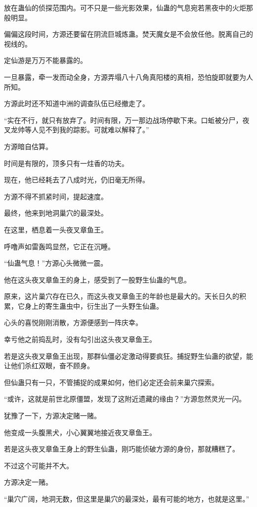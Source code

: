 \begin{this_body}
放在蛊仙的侦探范围内。可不只是一些光影效果，仙蛊的气息宛若黑夜中的火炬那般明显。

偏偏这段时间，方源还要留在阴流巨城炼蛊。焚天魔女是不会放任他。脱离自己的视线的。

定仙游是万万不能暴露的。

一旦暴露，牵一发而动全身，方源弄塌八十八角真阳楼的真相，恐怕旋即就要为人所知。

方源此时还不知道中洲的调查队伍已经撤走了。

“实在不行，就只有放弃了。时间有限，万一那边战场停歇下来。口蚯被分尸，夜叉龙帅等人见不到我的踪影。可就难以解释了。”

方源暗自估算。

时间是有限的，顶多只有一炷香的功夫。

现在，他已经耗去了八成时光，仍旧毫无所得。

方源不得不抓紧时间，提起速度。

最终，他来到地洞巢穴的最深处。

在这里，栖息着一头夜叉章鱼王。

呼噜声如雷轰鸣显然，它正在沉睡。

“仙蛊气息！”方源心头微微一震。

他在这头夜叉章鱼王的身上，感受到了一股野生仙蛊的气息。

原来，这片巢穴存在已久，而这头夜叉章鱼王的年龄也是最大的。天长日久的积累，它身上的寄生蛊虫中，衍生出了一头野生仙蛊。

心头的喜悦刚刚消散，方源便感到一阵庆幸。

幸亏他之前捣乱时，没有勾引出这头夜叉章鱼王。

若是这头夜叉章鱼王出现，那群仙僵必定激动得要疯狂。捕捉野生仙蛊的欲望，能让他们杀红双眼，奋不顾身。

但仙蛊只有一只，不管捕捉的成果如何，他们必定还会前来巢穴探索。

“或许，这就是前世北原僵盟，发现了这附近遗藏的缘由？”方源忽然灵光一闪。

犹豫了一下，方源决定赌一赌。

他变成一头腹黑犬，小心翼翼地接近夜叉章鱼王。

若是这头夜叉章鱼王身上的野生仙蛊，刚巧能侦破方源的身份，那就糟糕了。

不过这个可能并不大。

方源决定一赌。

“巢穴广阔，地洞无数，但这里是巢穴的最深处，最有可能的地方，也就是这里。”


\end{this_body}
